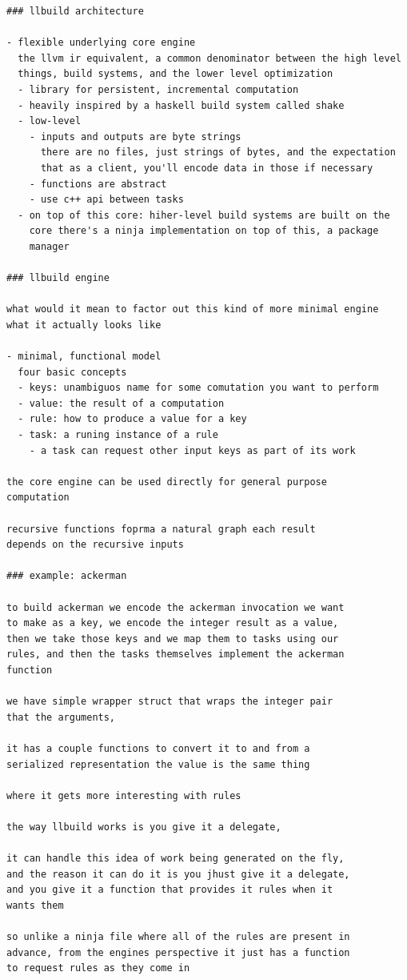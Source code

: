 \documentclass[12pt, a4paper]{report}
\begin{document}
\begin{Verbatim}[fontsize=\small]
### llbuild architecture

- flexible underlying core engine
  the llvm ir equivalent, a common denominator between the high level
  things, build systems, and the lower level optimization
  - library for persistent, incremental computation
  - heavily inspired by a haskell build system called shake
  - low-level
    - inputs and outputs are byte strings
      there are no files, just strings of bytes, and the expectation
      that as a client, you'll encode data in those if necessary
    - functions are abstract
    - use c++ api between tasks
  - on top of this core: hiher-level build systems are built on the
    core there's a ninja implementation on top of this, a package
    manager

### llbuild engine

what would it mean to factor out this kind of more minimal engine
what it actually looks like

- minimal, functional model
  four basic concepts
  - keys: unambiguos name for some comutation you want to perform
  - value: the result of a computation
  - rule: how to produce a value for a key
  - task: a runing instance of a rule
    - a task can request other input keys as part of its work

the core engine can be used directly for general purpose
computation

recursive functions foprma a natural graph each result
depends on the recursive inputs

### example: ackerman

to build ackerman we encode the ackerman invocation we want
to make as a key, we encode the integer result as a value,
then we take those keys and we map them to tasks using our
rules, and then the tasks themselves implement the ackerman
function

we have simple wrapper struct that wraps the integer pair
that the arguments,

it has a couple functions to convert it to and from a
serialized representation the value is the same thing

where it gets more interesting with rules

the way llbuild works is you give it a delegate,

it can handle this idea of work being generated on the fly,
and the reason it can do it is you jhust give it a delegate,
and you give it a function that provides it rules when it
wants them

so unlike a ninja file where all of the rules are present in
advance, from the engines perspective it just has a function
to request rules as they come in


\end{Verbatim}
\end{document}
